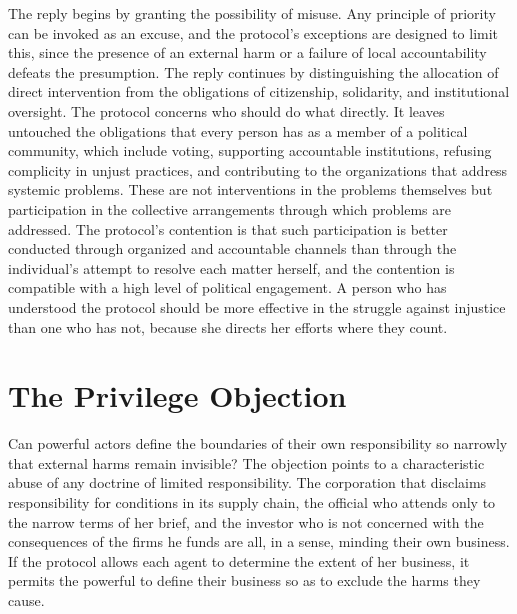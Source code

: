 \documentclass[11pt]{report}
\theoremstyle{definition}
\theoremstyle{remark}
\begin{document}
The reply begins by granting the possibility of misuse. Any principle of priority can be invoked as an excuse, and the protocol's exceptions are designed to limit this, since the presence of an external harm or a failure of local accountability defeats the presumption. The reply continues by distinguishing the allocation of direct intervention from the obligations of citizenship, solidarity, and institutional oversight. The protocol concerns who should do what directly. It leaves untouched the obligations that every person has as a member of a political community, which include voting, supporting accountable institutions, refusing complicity in unjust practices, and contributing to the organizations that address systemic problems. These are not interventions in the problems themselves but participation in the collective arrangements through which problems are addressed. The protocol's contention is that such participation is better conducted through organized and accountable channels than through the individual's attempt to resolve each matter herself, and the contention is compatible with a high level of political engagement. A person who has understood the protocol should be more effective in the struggle against injustice than one who has not, because she directs her efforts where they count.

\section{The Privilege Objection}

Can powerful actors define the boundaries of their own responsibility so narrowly that external harms remain invisible? The objection points to a characteristic abuse of any doctrine of limited responsibility. The corporation that disclaims responsibility for conditions in its supply chain, the official who attends only to the narrow terms of her brief, and the investor who is not concerned with the consequences of the firms he funds are all, in a sense, minding their own business. If the protocol allows each agent to determine the extent of her business, it permits the powerful to define their business so as to exclude the harms they cause.
\end{document}
